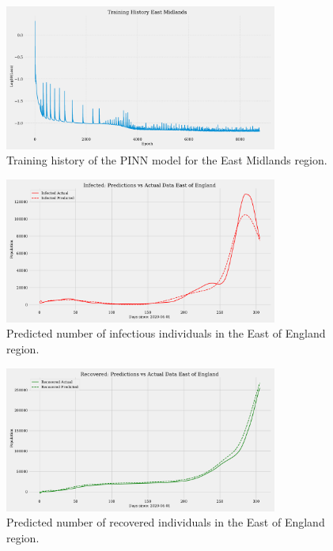 \documentclass[12pt, letterpaper]{report}
\begin{document}
\begin{figure}[ht]
    \centering
    \includegraphics[width=0.8\textwidth]{images/pinn/Training_History_East Midlands.pdf}
    \caption{Training history of the PINN model for the East Midlands region.}
    \label{fig:Training_History_East_Midlands}
\end{figure}

\begin{figure}[ht]
    \centering
    \includegraphics[width=0.8\textwidth]{images/pinn/I_predictions_East of England.pdf}
    \caption{Predicted number of infectious individuals in the East of England region.}
    \label{fig:I_predictions_East_of_England}
\end{figure}

\begin{figure}[ht]
    \centering
    \includegraphics[width=0.8\textwidth]{images/pinn/R_predictions_East of England.pdf}
    \caption{Predicted number of recovered individuals in the East of England region.}
    \label{fig:R_predictions_East_of_England}
\end{figure}
\end{document}

